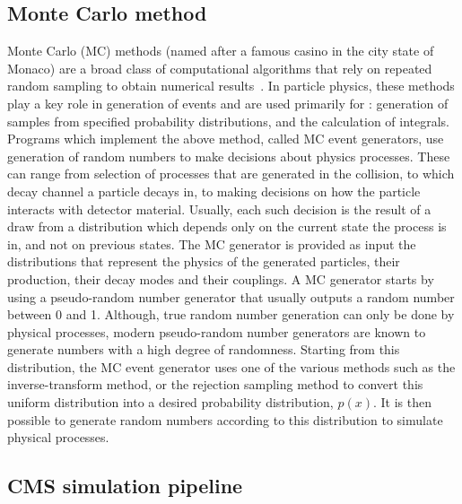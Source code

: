 \subsection{Monte Carlo method}

Monte Carlo (MC) methods (named after a famous casino in the city state of Monaco) are a broad class of computational algorithms that rely on repeated random sampling to obtain numerical results~\cite{mcwiki}. In particle physics, these methods play a key role in generation of events and are used primarily for : generation of samples from specified probability distributions, and the calculation of integrals. Programs which implement the above method, called MC event generators, use generation of random numbers to make decisions about physics processes. These can range from selection of processes that are generated in the collision, to which decay channel a particle decays in, to making decisions on how the particle interacts with detector material. Usually, each such decision is the result of a draw from a distribution which depends only on the current state the process is in, and not on previous states. The MC generator is provided as input the distributions that represent the physics of the generated particles, their production, their decay modes and their couplings. A MC generator starts by using a pseudo-random number generator that usually outputs a random number between 0 and 1. Although, true random number generation can only be done by physical processes, modern pseudo-random number generators are known to generate numbers with a high degree of randomness. Starting from this distribution, the MC event generator uses one of the various methods such as the inverse-transform method, or the rejection sampling method to convert this uniform distribution into a desired probability distribution, $p(x)$. It is then possible to generate random numbers according to this distribution to simulate physical processes. 


\subsection{CMS simulation pipeline}

